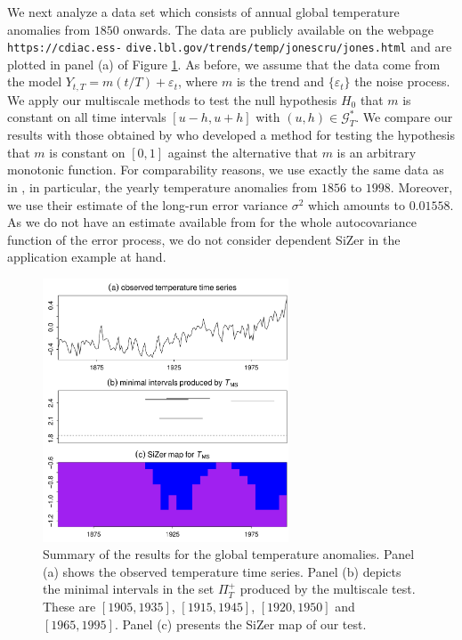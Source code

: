 We next analyze a data set which consists of annual global temperature anomalies from $1850$ onwards. The data are publicly available on the webpage \texttt{https://cdiac.ess-} \texttt{dive.lbl.gov/trends/temp/jonescru/jones.html} and are plotted in panel (a) of Figure \ref{fig:app:global}. As before, we assume that the data come from the model $Y_{t,T} = m(t/T) + \varepsilon_t$, where $m$ is the trend and $\{\varepsilon_t\}$ the noise process. We apply our multiscale methods to test the null hypothesis $H_0$ that $m$ is constant on all time intervals $[u-h,u+h]$ with $(u,h) \in \mathcal{G}_T^*$. We compare our results with those obtained by \cite{WuWoodroofeMentz2001} who developed a method for testing the hypothesis that $m$ is constant on $[0,1]$ against the alternative that $m$ is an arbitrary monotonic function. For comparability reasons, we use exactly the same data as in \cite{WuWoodroofeMentz2001}, in particular, the yearly temperature anomalies from $1856$ to $1998$. Moreover, we use their estimate of the long-run error variance $\sigma^2$ which amounts to $0.01558$. As we do not have an estimate available from \cite{WuWoodroofeMentz2001} for the whole autocovariance function of the error process, we do not consider dependent SiZer in the application example at hand.


\begin{figure}[t!]
\centering
\includegraphics[width=0.65\textwidth]{Plots/global_temperature.pdf}
\caption{Summary of the results for the global temperature anomalies. Panel (a) shows the observed temperature time series. Panel (b) depicts the minimal intervals in the set $\Pi_T^+$ produced by the multiscale test. These are $[1905,1935]$, $[1915,1945]$, $[1920,1950]$ and $[1965,1995]$. Panel (c) presents the SiZer map of our test. }\label{fig:app:global}
\end{figure}


